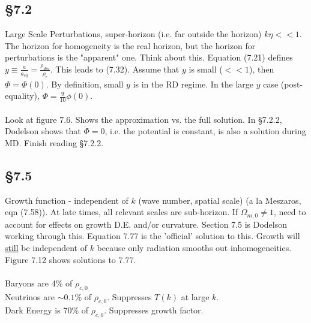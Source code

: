 \documentclass[12pt]{article}
\begin{document}
\subsection*{\S 7.2}
Large Scale Perturbations, super-horizon (i.e. far outside the horizon) $k\eta<<1$.  The horizon for homogeneity is the real horizon, but the horizon for perturbations is the "apparent" one.  Think about this.  Equation (7.21) defines $y\equiv\frac{a}{a_{eq}}=\frac{\rho_{dm}}{\rho_r}$.  This leads to (7.32).  Assume that $y$ is small ($<<1$), then $\Phi=\Phi(0)$.  By definition, small $y$ is in the RD regime.  In the large $y$ case (post-equality), $\Phi=\frac{9}{10}\phi(0)$.
\\ \\
Look at figure 7.6.  Shows the approximation vs. the full solution.  In \S 7.2.2, Dodelson shows that $\dot{\Phi}=0$, i.e. the potential is constant, is also a solution during MD.  Finish reading \S 7.2.2.
\subsection*{\S7.5}
Growth function - independent of $k$ (wave number, spatial scale) (a la Meszaros, eqn (7.58)).  At late times, all relevant scales are sub-horizon.  If $\Omega_{m,0}\neq 1$, need to account for effects on growth D.E. and/or curvature.  Section 7.5 is Dodelson working through this.  Equation 7.77 is the 'official' solution to this.  Growth will \underline{still} be independent of $k$ because only radiation smooths out inhomogeneities.  Figure 7.12 shows solutions to 7.77.
\\ \\
Baryons are 4\% of $\rho_{c,0}$\\
Neutrinos are $\sim0.1\%$ of $\rho_{c,0}$.  Suppresses $T(k)$ at large $k$.\\
Dark Energy is 70\% of $\rho_{c,0}$.  Suppresses growth factor.\\
\end{document}
